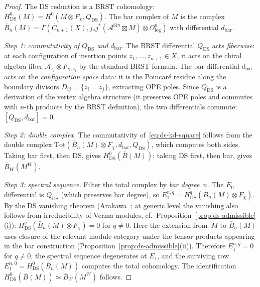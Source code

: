 \begin{proof}
The DS reduction is a BRST cohomology:
$H^0_{\mathrm{DS}}(M) = H^0(M \otimes F_\chi, Q_{\mathrm{DS}})$.
The bar complex of $M$ is the complex
$\bar{B}_n(M) = \Gamma(\overline{C}_{n+1}(X),
j_*j^*(\mathcal{A}^{\boxtimes n} \boxtimes M)
\otimes \Omega^n_{\log})$
with differential $d_{\mathrm{bar}}$.

\emph{Step 1: commutativity of $Q_{\mathrm{DS}}$ and $d_{\mathrm{bar}}$.}
The BRST differential $Q_{\mathrm{DS}}$ acts \emph{fiberwise}: at each
configuration of insertion points $z_1, \ldots, z_{n+1} \in X$, it
acts on the chiral algebra fiber $\mathcal{A}_{z_i} \otimes F_{\chi,z_i}$
by the standard BRST formula. The bar differential $d_{\mathrm{bar}}$
acts on the \emph{configuration space} data: it is the Poincar\'e
residue along the boundary divisors $D_{ij} = \{z_i = z_j\}$,
extracting OPE poles. Since $Q_{\mathrm{DS}}$ is a derivation of the
vertex algebra structure (it preserves OPE poles and commutes with
$n$-th products by the BRST definition), the two differentials
commute: $[Q_{\mathrm{DS}}, d_{\mathrm{bar}}] = 0$.

\emph{Step 2: double complex.}
The commutativity of~\eqref{eq:ds-kd-square} follows from the
double complex
$\mathrm{Tot}(\bar{B}_n(M) \otimes F_\chi, d_{\mathrm{bar}},
Q_{\mathrm{DS}})$, which computes both sides.
Taking bar first, then DS, gives
$H^0_{\mathrm{DS}}(\bar{B}(M))$; taking DS first, then bar,
gives $\bar{B}_W(M^W)$.

\emph{Step 3: spectral sequence.}
Filter the total complex by \emph{bar degree}~$n$.
The $E_0$ differential is $Q_{\mathrm{DS}}$ (which preserves
bar degree), so
$E_1^{n,q} = H^q_{\mathrm{DS}}(\bar{B}_n(M) \otimes F_\chi)$.
By the DS vanishing theorem
\textup{(}Arakawa~\textup{\cite{Ara07}};
at generic level the vanishing also follows from irreducibility
of Verma modules,
cf.\ Proposition~\textup{\ref{prop:ds-admissible}(i)}\textup{)}:
$H^q_{\mathrm{DS}}(\bar{B}_n(M) \otimes F_\chi) = 0$ for
$q \neq 0$. Here the extension from~$M$ to $\bar{B}_n(M)$
uses closure of the relevant module category under the tensor
products appearing in the bar construction
(Proposition~\ref{prop:ds-admissible}(ii)).
Therefore $E_1^{n,q} = 0$ for $q \neq 0$, the spectral
sequence degenerates at $E_1$, and the surviving row
$E_1^{n,0} = H^0_{\mathrm{DS}}(\bar{B}_n(M))$ computes
the total cohomology. The identification
$H^0_{\mathrm{DS}}(\bar{B}(M)) \simeq \bar{B}_W(M^W)$
follows.
\end{proof}

